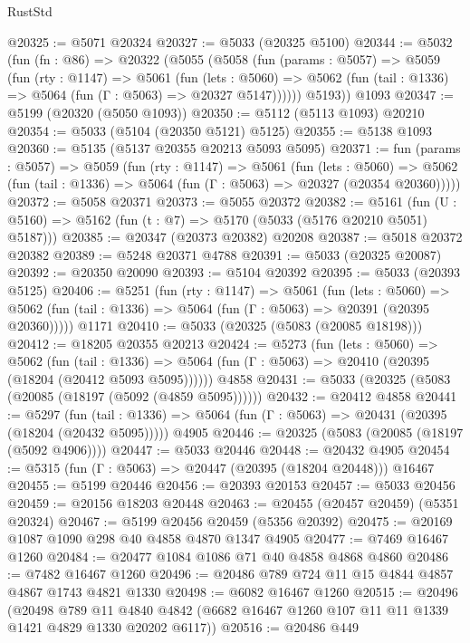 \begin{lexlean}{RustStd}
\begin{coremodule}
@20325 := @5071 @20324
@20327 := @5033 (@20325 @5100)
@20344 := @5032
    (fun (fn : @86) =>
    @20322
      (@5055
        (@5058
          (fun (params : @5057) =>
          @5059
            (fun (rty : @1147) =>
            @5061
              (fun (lets : @5060) =>
              @5062 (fun (tail : @1336) => @5064 (fun (Γ : @5063) => @20327 @5147))))))
        @5193))
    @1093
@20347 := @5199 (@20320 (@5050 @1093))
@20350 := @5112 (@5113 @1093) @20210
@20354 := @5033 (@5104 (@20350 @5121) @5125)
@20355 := @5138 @1093
@20360 := @5135 (@5137 @20355 @20213 @5093 @5095)
@20371 := fun (params : @5057) =>
  @5059
    (fun (rty : @1147) =>
    @5061
      (fun (lets : @5060) =>
      @5062 (fun (tail : @1336) => @5064 (fun (Γ : @5063) => @20327 (@20354 @20360)))))
@20372 := @5058 @20371
@20373 := @5055 @20372
@20382 := @5161
    (fun (U : @5160) => @5162 (fun (t : @7) => @5170 (@5033 (@5176 @20210 @5051) @5187)))
@20385 := @20347 (@20373 @20382) @20208
@20387 := @5018 @20372 @20382
@20389 := @5248 @20371 @4788
@20391 := @5033 (@20325 @20087)
@20392 := @20350 @20090
@20393 := @5104 @20392
@20395 := @5033 (@20393 @5125)
@20406 := @5251
    (fun (rty : @1147) =>
    @5061
      (fun (lets : @5060) =>
      @5062 (fun (tail : @1336) => @5064 (fun (Γ : @5063) => @20391 (@20395 @20360)))))
    @1171
@20410 := @5033 (@20325 (@5083 (@20085 @18198)))
@20412 := @18205 @20355 @20213
@20424 := @5273
    (fun (lets : @5060) =>
    @5062
      (fun (tail : @1336) =>
      @5064 (fun (Γ : @5063) => @20410 (@20395 (@18204 (@20412 @5093 @5095))))))
    @4858
@20431 := @5033 (@20325 (@5083 (@20085 (@18197 (@5092 (@4859 @5095))))))
@20432 := @20412 @4858
@20441 := @5297
    (fun (tail : @1336) => @5064 (fun (Γ : @5063) => @20431 (@20395 (@18204 (@20432 @5095)))))
    @4905
@20446 := @20325 (@5083 (@20085 (@18197 (@5092 @4906))))
@20447 := @5033 @20446
@20448 := @20432 @4905
@20454 := @5315 (fun (Γ : @5063) => @20447 (@20395 (@18204 @20448))) @16467
@20455 := @5199 @20446
@20456 := @20393 @20153
@20457 := @5033 @20456
@20459 := @20156 @18203 @20448
@20463 := @20455 (@20457 @20459) (@5351 @20324)
@20467 := @5199 @20456 @20459 (@5356 @20392)
@20475 := @20169 @1087 @1090 @298 @40 @4858 @4870 @1347 @4905
@20477 := @7469 @16467 @1260
@20484 := @20477 @1084 @1086 @71 @40 @4858 @4868 @4860
@20486 := @7482 @16467 @1260
@20496 := @20486 @789 @724 @11 @15 @4844 @4857 @4867 @1743 @4821 @1330
@20498 := @6082 @16467 @1260
@20515 := @20496
    (@20498
      @789
      @11
      @4840
      @4842
      (@6682 @16467 @1260 @107 @11 @11 @1339 @1421 @4829 @1330 @20202 @6117))
@20516 := @20486 @449

\end{coremodule}
\end{lexlean}
